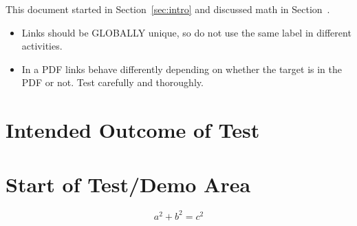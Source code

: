 \documentclass{ximera}
\begin{document}
This document started in Section~\ref{sec:intro} and discussed math in Section~.


\begin{remark}
    \begin{itemize}
        \item  Links should be GLOBALLY unique, so do not use the same label in different activities.
        \item  In a PDF links behave differently depending on whether the target is in the PDF or not. 
            Test carefully and thoroughly.
    \end{itemize}
\end{remark}


\section{Intended Outcome of Test}


\section{Start of Test/Demo Area}

\begin{equation}
a^2 + b^2 = c^2    \label{eq:pyth}
\end{equation}

\hrulefill
\end{document}
